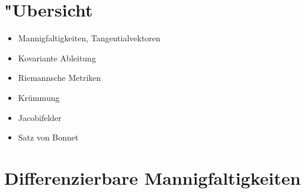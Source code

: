 
\section*{"Ubersicht}

\begin{itemize}
\item Mannigfaltigkeiten, Tangentialvektoren
\item Kovariante Ableitung
\item Riemannsche Metriken
\item Krümmung
\item Jacobifelder
\item Satz von Bonnet
\end{itemize}

\section{Differenzierbare Mannigfaltigkeiten}

